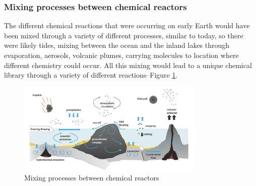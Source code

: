 \documentclass[]{article}
\begin{document}
\subsubsection{Mixing processes between chemical reactors}

The different chemical reactions that were occurring on early Earth would have been mixed through a variety of different processes, similar to today, so there were likely tides, mixing between the ocean and the inland lakes through evaporation, aerosols, volcanic plumes, carrying molecules to location where different chemistry could occur. All this mixing would lead to a unique chemical library through a variety of different reactions--Figure \ref{fig:MixingProcesses}.
 
\begin{figure}[H]
	\caption[Mixing processes between chemical reactors]{Mixing processes between chemical reactors \cite{stueken2013did}}\label{fig:MixingProcesses}
	\includegraphics[width=0.8\textwidth]{MixingProcesses}
\end{figure}

  
  
\end{document}

